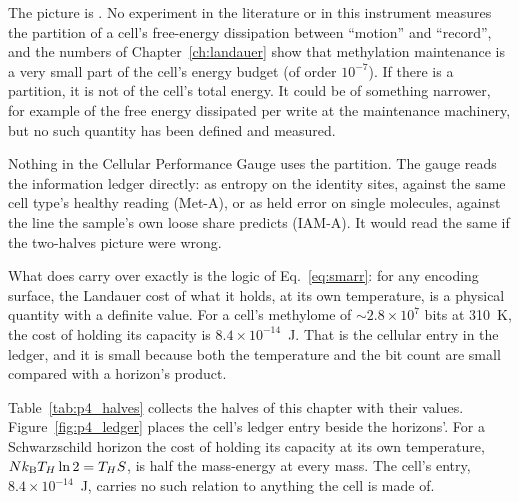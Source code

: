 \begin{keybox}[title=Status of the two-halves picture for a cell]
The picture is \conjecture. No experiment in the literature or in this instrument measures the
partition of a cell's free-energy dissipation between ``motion'' and ``record'', and the numbers of
Chapter~\ref{ch:landauer} show that methylation maintenance is a very small part of the cell's energy
budget (of order $10^{-7}$). If there is a partition, it is not of the cell's total energy. It could
be of something narrower, for example of the free energy dissipated per write at the maintenance
machinery, but no such quantity has been defined and measured. \openprob

Nothing in the Cellular Performance Gauge uses the partition. The gauge reads the information ledger directly: as entropy on the identity sites, against the same cell type's healthy reading (Met-A), or as held error on single molecules, against the line the sample's own loose share predicts (IAM-A). It would read the same if the
two-halves picture were wrong.
\end{keybox}

What does carry over exactly is the logic of Eq.~\eqref{eq:smarr}: for any encoding surface, the
Landauer cost of what it holds, at its own temperature, is a physical quantity with a definite value.
For a cell's methylome of $\sim2.8\times10^7$ bits at 310~K, the cost of holding its capacity is
$8.4\times10^{-14}$~J. \calc{} That is the cellular entry in the ledger, and it is small because both
the temperature and the bit count are small compared with a horizon's product.

Table~\ref{tab:p4_halves} collects the halves of this chapter with their values. Figure~\ref{fig:p4_ledger} places the cell's ledger entry
beside the horizons'. For a Schwarzschild horizon the cost of holding its capacity at its own temperature, $Nk_{\mathrm B} T_H\ln2=T_HS$, is half the
mass-energy at every mass. The cell's entry, $8.4\times10^{-14}$~J, carries no such relation to anything the cell is made of. \calc

